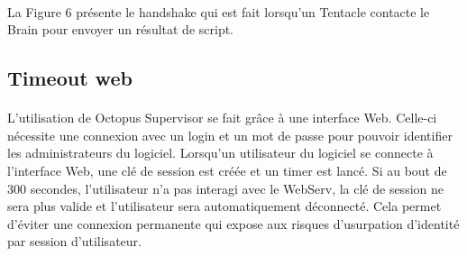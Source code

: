 \paragraph{}
La Figure 6 présente le handshake qui est fait lorsqu'un Tentacle contacte le Brain pour envoyer un résultat de script.
\paragraph{}

\subsection{Timeout web}
\paragraph{}
L'utilisation de Octopus Supervisor se fait grâce à une interface Web. Celle-ci nécessite une connexion avec un login et un mot de passe pour pouvoir identifier les administrateurs du logiciel.
Lorsqu'un utilisateur du logiciel se connecte à l'interface Web, une clé de session est créée et un timer est lancé. Si au bout de 300 secondes, l'utilisateur n'a pas interagi avec le WebServ, la clé de session ne sera plus valide et l'utilisateur sera automatiquement déconnecté.
Cela permet d'éviter une connexion permanente qui expose aux risques d'usurpation d'identité par session d'utilisateur.
